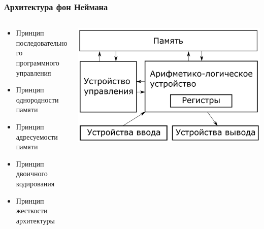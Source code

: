 \documentclass{../../slides-style}
\begin{document}
    \begin{frame}
        \frametitle{Архитектура фон Неймана}
        \begin{columns}
            \begin{column}{0.6\textwidth}
                \begin{itemize}
                    \item Принцип последовательного программного управления
                    \item Принцип однородности памяти
                    \item Принцип адресуемости памяти
                    \item Принцип двоичного кодирования
                    \item Принцип жесткости архитектуры
                \end{itemize}
            \end{column}
            \begin{column}{0.4\textwidth}
                \begin{center}
                    \includegraphics[width=\textwidth]{vonNeumannArchitecture.png}
                \end{center}
            \end{column}
        \end{columns}
    \end{frame}
\end{document}
